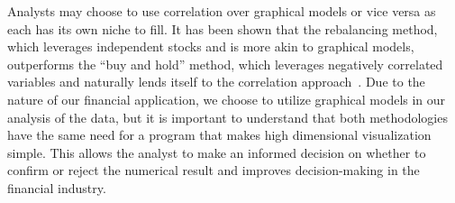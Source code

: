 Analysts may choose to use correlation over graphical models or vice versa as each has its own niche to fill. It has been shown that the rebalancing method, which leverages independent stocks and is more akin to graphical models, outperforms the ``buy and hold'' method, which leverages negatively correlated variables and naturally lends itself to the correlation approach~\cite{liuh2016}. Due to the nature of our financial application, we choose to utilize graphical models in our analysis of the data, but it is important to understand that both methodologies have the same need for a program that makes high dimensional visualization simple. This allows the analyst to make an informed decision on whether to confirm or reject the numerical result and improves decision-making in the financial industry.